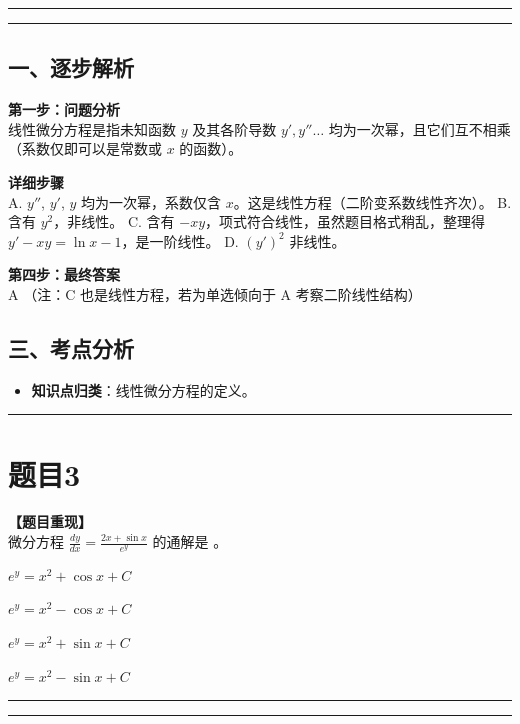 \documentclass[12pt, a4paper]{ctexart}
\newcommand{\TopSeparator}{
    \par\noindent\rule{\textwidth}{1.5pt}\vspace{0.5em} %
}
\newcommand{\AnalysisSeparator}{
    \par\noindent\rule{\textwidth}{0.5pt}\vspace{0.2em}\hrule\vspace{0.5em} %
}
\newenvironment{RedAnalysis}{
    \par
    \color{red} %
}{
    \par
    \color{black} %
}
\newcommand{\choicesTwo}[4]{
    \begin{enumerate}[label=\Alph*., itemsep=0pt, parsep=0pt, topsep=5pt, labelsep=0.5em]
        \begin{minipage}{0.45\linewidth} \item #1 \end{minipage}
        \begin{minipage}{0.45\linewidth} \item #2 \end{minipage}
        \begin{minipage}{0.45\linewidth} \item #3 \end{minipage}
        \begin{minipage}{0.45\linewidth} \item #4 \end{minipage}
    \end{enumerate}
}
\begin{document}
\AnalysisSeparator

\begin{RedAnalysis}

\subsection*{一、逐步解析}

\textbf{第一步：问题分析} \\
线性微分方程是指未知函数 $y$ 及其各阶导数 $y', y'' \dots$ 均为一次幂，且它们互不相乘（系数仅即可以是常数或 $x$ 的函数）。

\textbf{详细步骤} \\
A. $y''$, $y'$, $y$ 均为一次幂，系数仅含 $x$。这是线性方程（二阶变系数线性齐次）。
B. 含有 $y^2$，非线性。
C. 含有 $-xy$，项式符合线性，虽然题目格式稍乱，整理得 $y'-xy=\ln x - 1$，是一阶线性。
D. $(y')^2$ 非线性。

\textbf{第四步：最终答案} \\
A （注：C 也是线性方程，若为单选倾向于 A 考察二阶线性结构）

\subsection*{三、考点分析}
\begin{itemize}
    \item \textbf{知识点归类}：线性微分方程的定义。
\end{itemize}

\end{RedAnalysis}

\vspace{2em}

\TopSeparator
\section*{题目3}

\textbf{【题目重现】} \\
微分方程 $ \frac{dy}{dx}=\frac{2x+\sin x}{e^{y}} $ 的通解是 \underline{\hspace{1cm}}。
\choicesTwo
{$ e^{y}=x^{2}+\cos x+C $}
{$ e^{y}=x^{2}-\cos x+C $}
{$ e^{y}=x^{2}+\sin x+C $}
{$ e^{y}=x^{2}-\sin x+C $}

\AnalysisSeparator
\end{document}
